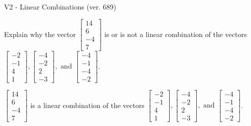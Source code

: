 \begin{exercise}
  \begin{exerciseTitle}V2 - Linear Combinations (ver. 689)\end{exerciseTitle}
  \begin{exerciseStatement}
    Explain why the vector \(\left[\begin{array}{c}
14 \\
6 \\
-4 \\
7
\end{array}\right]\)  is or is not a linear 
	combination of the vectors \(\left[\begin{array}{c}
-2 \\
-1 \\
4 \\
1
\end{array}\right] , \left[\begin{array}{c}
-4 \\
-2 \\
2 \\
-3
\end{array}\right] , \text{ and } \left[\begin{array}{c}
-4 \\
-1 \\
-4 \\
-2
\end{array}\right]\).
	


  \end{exerciseStatement}
  \begin{exerciseAnswer}
   \(\left[\begin{array}{c}
14 \\
6 \\
-4 \\
7
\end{array}\right]\) 
  	 is  
	a linear combination of the vectors \(\left[\begin{array}{c}
-2 \\
-1 \\
4 \\
1
\end{array}\right] , \left[\begin{array}{c}
-4 \\
-2 \\
2 \\
-3
\end{array}\right] , \text{ and } \left[\begin{array}{c}
-4 \\
-1 \\
-4 \\
-2
\end{array}\right]\).

	
  


  \end{exerciseAnswer}
\end{exercise}